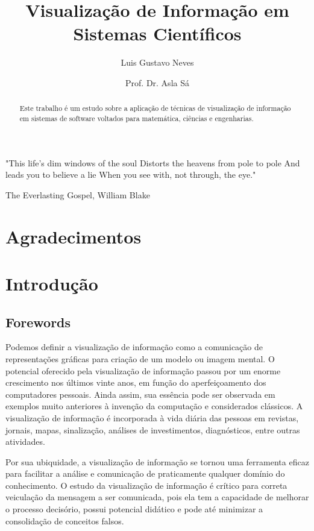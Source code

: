 \documentclass[]{article}
\title{Visualização de Informação em Sistemas Científicos}
\author{Luis Gustavo Neves 
\and Prof. Dr. Asla Sá}
\begin{document}
\maketitle

\begin{abstract}

Este trabalho é um estudo sobre a aplicação de técnicas de visualização de informação em sistemas de software voltados para matemática, ciências e engenharias. 

\end{abstract}

\epigraph{"This life's dim windows of the soul
Distorts the heavens from pole to pole
And leads you to believe a lie
When you see with, not through, the eye."}{The Everlasting Gospel, William Blake}

\tableofcontents

\section{Agradecimentos}

\section{Introdução} 

\subsection{Forewords}

Podemos definir a visualização de informação como a comunicação de representações gráficas para criação de um modelo ou imagem mental. O potencial oferecido pela visualização de informação passou por um enorme crescimento nos últimos vinte anos, em função do aperfeiçoamento dos computadores pessoais. Ainda assim, sua essência pode ser observada em exemplos muito anteriores à invenção da computação e considerados clássicos. A visualização de informação é incorporada à vida diária das pessoas em revistas, jornais, mapas, sinalização, análises de investimentos, diagnósticos, entre outras atividades.

Por sua ubiquidade, a visualização de informação se tornou uma ferramenta eficaz para facilitar a análise e comunicação de praticamente qualquer domínio do conhecimento. O estudo da visualização de informação é crítico para correta veiculação da mensagem a ser comunicada, pois ela tem a capacidade de melhorar o processo decisório, possui potencial didático e pode até minimizar a consolidação de conceitos falsos.
\end{document}
